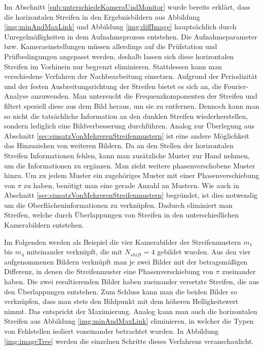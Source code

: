 Im Abschnitt \ref{sub:unterschiedeKameraUndMonitor} wurde bereits erklärt, dass die horizontalen Streifen in den Ergebnisbildern aus Abbildung \ref{img:minAndMaxLink} und Abbildung \ref{img:diffImage} hauptsächlich durch Unregelmäßigkeiten in dem Aufnahmeprozess entstehen.
Die Aufnahmeparameter bzw. Kameraeinstellungen müssen allerdings auf die Prüfstation und Prüfbedingungen angepasst werden, deshalb lassen sich diese horizontalen Streifen im Vorhinein nur begrenzt eliminieren.
Stattdessen kann man verschiedene Verfahren der Nachbearbeitung einsetzen.
Aufgrund der Periodizität und der festen Ausbreitungsrichtung der Streifen bietet es sich an, die Fourier-Analyse anzuwenden.
Man untersucht die Frequenzkomponenten der Streifen und filtert speziell diese aus dem Bild heraus, um sie zu entfernen.
Dennoch kann man so nicht die tatsächliche Information an den dunklen Streifen wiederherstellen, sondern lediglich eine Bildverbesserung durchführen.
Analog zur Überlegung aus Abschnitt \ref{sec:einsatzVonMehrerenStreifenmustern} ist eine andere Möglichkeit das Hinzuziehen von weiteren Bildern.
Da an den Stellen der horizontalen Streifen Informationen fehlen, kann man zusätzliche Muster zur Hand nehmen, um die Informationen zu ergänzen.
Man zieht weitere phasenverschobene Muster hinzu.
Um zu jedem Muster ein zugehöriges Muster mit einer Phasenverschiebung von $\pi$ zu haben, benötigt man eine gerade Anzahl an Mustern.
Wie auch in Abschnitt \ref{sec:einsatzVonMehrerenStreifenmustern} begründet, ist dies notwendig um die Oberflächeninformationen zu verknüpfen.
Dadurch eliminiert man Streifen, welche durch Überlappungen von Streifen in den unterschiedlichen Kamerabildern entstehen.

\p
Im Folgenden werden als Beispiel die vier Kamerabilder der Streifenmustern $m_1$ bis $m_4$ miteinander verknüpft, die mit $N_{shift} = 4$ gebildet wurden.
Aus den vier aufgenommenen Bildern verknüpft man je zwei Bilder mit der betragsmäßigen Differenz, in denen die Streifenmuster eine Phasenverschiebung von $\pi$ zueinander haben.
Die zwei resultierenden Bilder haben zueinander versetzte Streifen, die aus den Überlappungen entstehen.
Zum Schluss kann man die beiden Bilder so verknüpfen, dass man stets den Bildpunkt mit dem höheren Helligkeitswert nimmt.
Das entspricht der Maximierung.
Analog kann man auch die horizontalen Streifen aus Abbildung \ref{img:minAndMaxLink} eliminieren, in welcher die Typen von Fehlstellen isoliert voneinander betrachtet wurden.
In Abbildung \ref{img:imageTree} werden die einzelnen Schritte dieses Verfahrens veranschaulicht.

